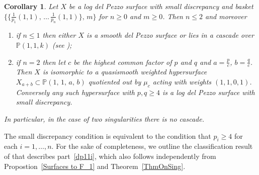 \documentclass[12pt]{amsbook}
\theoremstyle{plain}
\newtheorem{cor}[thm]{Corollary}
\newcommand{\mb}[1]{\mathbb{#1}}
\renewcommand{\P}{\mathbb{P}}
\begin{document}
\begin{cor}
Let $X$ be a log del Pezzo surface with small discrepancy and
basket  $\{ \{ \frac{1}{p_1}(1,1), \, \dots \, \frac{1}{p_n}(1,1) \}, \, m \}$
for $n\ge0$ and $m\ge0$. Then $n\le2$ and moreover
\begin{enumerate}
\item\label{dp11i}
if $n\le1$ then either $X$ is a smooth del Pezzo surface or 
lies in a cascade over $\P(1,1,k)$ (see \cite[Table ??]{CP});
\item\label{dp11ii}
if $n=2$ then let $c$ be the highest common factor of $p$ and $q$ and $a = \frac{p}{c}$, $b = \frac{q}{c}$. Then $X$
is isomorphic to a quasismooth weighted hypersurface
$X_{a+b}\subset \mb{P}(1,\,1,\,a,\,b)$ quotiented out by $\mu_c$ acting with weights $(1,1,0,1)$. Conversely any such hypersurface with $p,q\ge4$ is
a log del Pezzo surface with small discrepancy.
\end{enumerate}
In particular, in the case of two singularities there is no cascade.
\end{cor}

The small discrepancy condition is equivalent to the condition that
$p_i \geq 4$ for each $i=1,\dots,n$. 
For the sake of completeness, we outline the classification result of \cite{CP} that
describes part~\ref{dp11i}, which also follows independently from Propostion~\ref{Surfaces to F_1} and Theorem~\ref{ThmOnSing}.
\end{document}
